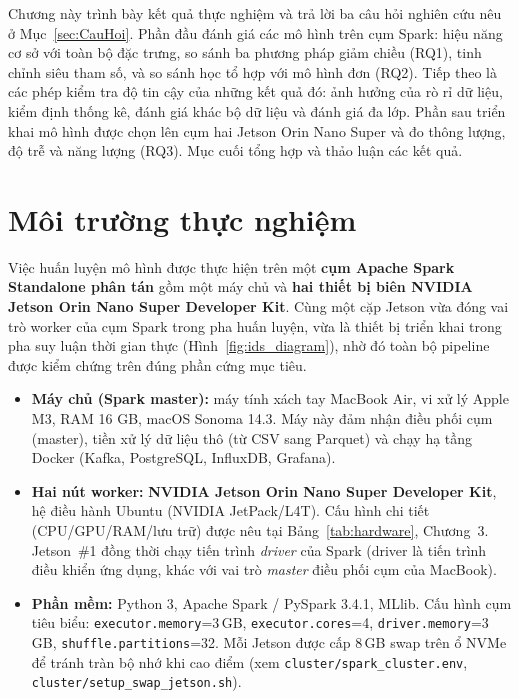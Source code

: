 
Chương này trình bày kết quả thực nghiệm và trả lời ba câu hỏi nghiên cứu nêu ở Mục~\ref{sec:CauHoi}. Phần đầu đánh giá các mô hình trên cụm Spark: hiệu năng cơ sở với toàn bộ đặc trưng, so sánh ba phương pháp giảm chiều (RQ1), tinh chỉnh siêu tham số, và so sánh học tổ hợp với mô hình đơn (RQ2). Tiếp theo là các phép kiểm tra độ tin cậy của những kết quả đó: ảnh hưởng của rò rỉ dữ liệu, kiểm định thống kê, đánh giá khác bộ dữ liệu và đánh giá đa lớp. Phần sau triển khai mô hình được chọn lên cụm hai Jetson Orin Nano Super và đo thông lượng, độ trễ và năng lượng (RQ3). Mục cuối tổng hợp và thảo luận các kết quả.

\section{Môi trường thực nghiệm}

Việc huấn luyện mô hình được thực hiện trên một \textbf{cụm Apache Spark Standalone phân tán} gồm một máy chủ và \textbf{hai thiết bị biên NVIDIA Jetson Orin Nano Super Developer Kit}. Cùng một cặp Jetson vừa đóng vai trò worker của cụm Spark trong pha huấn luyện, vừa là thiết bị triển khai trong pha suy luận thời gian thực (Hình~\ref{fig:ids_diagram}), nhờ đó toàn bộ pipeline được kiểm chứng trên đúng phần cứng mục tiêu.

\begin{itemize}
  \item \textbf{Máy chủ (Spark master):} máy tính xách tay MacBook Air, vi xử lý Apple M3, RAM 16 GB, macOS Sonoma 14.3. Máy này đảm nhận điều phối cụm (master), tiền xử lý dữ liệu thô (từ CSV sang Parquet) và chạy hạ tầng Docker (Kafka, PostgreSQL, InfluxDB, Grafana).
  \item \textbf{Hai nút worker:} \textbf{NVIDIA Jetson Orin Nano Super Developer Kit}, hệ điều hành Ubuntu (NVIDIA JetPack/L4T). Cấu hình chi tiết (CPU/GPU/RAM/lưu trữ) được nêu tại Bảng~\ref{tab:hardware}, Chương~3. Jetson~\#1 đồng thời chạy tiến trình \emph{driver} của Spark (driver là tiến trình điều khiển ứng dụng, khác với vai trò \emph{master} điều phối cụm của MacBook).
  \item {\sloppy \textbf{Phần mềm:} Python 3, Apache Spark / PySpark 3.4.1, MLlib. Cấu hình cụm tiêu biểu: \texttt{executor.memory}=3\,GB, \texttt{executor.cores}=4, \texttt{driver.memory}=3\,GB, \texttt{shuffle.partitions}=32. Mỗi Jetson được cấp 8\,GB swap trên ổ NVMe để tránh tràn bộ nhớ khi cao điểm (xem \texttt{cluster/spark\_cluster.env}, \texttt{cluster/setup\_swap\_jetson.sh}).\par}
\end{itemize}


